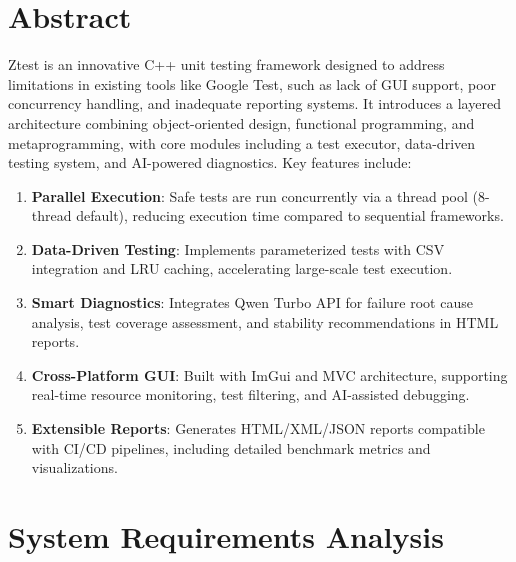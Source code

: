 \documentclass{article}
\begin{document}
\section{Abstract}
Ztest is an innovative C++ unit testing framework designed to address limitations in existing tools like Google Test, such as lack of GUI support, poor concurrency handling, and inadequate reporting systems. It introduces a layered architecture combining object-oriented design, functional programming, and metaprogramming, with core modules including a test executor, data-driven testing system, and AI-powered diagnostics. Key features include:
\begin{enumerate}
    \item \textbf{Parallel Execution}: Safe tests are run concurrently via a thread pool (8-thread default), reducing execution time compared to sequential frameworks.
    \item \textbf{Data-Driven Testing}: Implements parameterized tests with CSV integration and LRU caching, accelerating large-scale test execution.
    \item \textbf{Smart Diagnostics}: Integrates Qwen Turbo API for failure root cause analysis, test coverage assessment, and stability recommendations in HTML reports.
    \item \textbf{Cross-Platform GUI}: Built with ImGui and MVC architecture, supporting real-time resource monitoring, test filtering, and AI-assisted debugging.
    \item \textbf{Extensible Reports}: Generates HTML/XML/JSON reports compatible with CI/CD pipelines, including detailed benchmark metrics and visualizations.
\end{enumerate}
\section{System Requirements Analysis}
\end{document}
